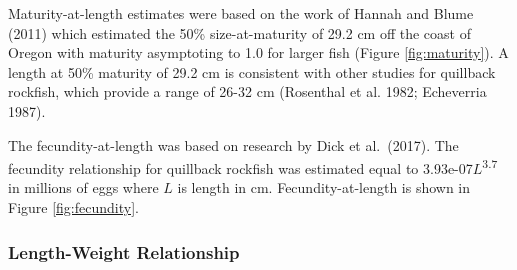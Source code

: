\documentclass[11pt,
  english,
  letterpaper,
]{article}
\begin{document}
\leavevmode\tagmcend\tagstructend


Maturity-at-length estimates were based on the work of Hannah and Blume {(2011)\leavevmode\tagmcend\tagstructend} which estimated the 50\% size-at-maturity of 29.2 cm off the coast of Oregon with maturity asymptoting to 1.0 for larger fish (Figure \ref{fig:maturity}). A length at 50\% maturity of 29.2 cm is consistent with other studies for quillback rockfish, which provide a range of 26-32 cm {(Rosenthal et al. 1982; Echeverria 1987)\leavevmode\tagmcend\tagstructend}.

\leavevmode\tagmcend\tagstructend\par


The fecundity-at-length was based on research by Dick et al.~{(2017)\leavevmode\tagmcend\tagstructend}. The fecundity relationship for quillback rockfish was estimated equal to 3.93e-07{\(L\)\leavevmode\tagmcend\tagstructend}\textsuperscript{3.7} in millions of eggs where {\(L\)\leavevmode\tagmcend\tagstructend} is length in cm. Fecundity-at-length is shown in Figure \ref{fig:fecundity}.

\leavevmode\tagmcend\tagstructend\par


\hypertarget{length-weight-relationship}{%
\subsubsection{Length-Weight Relationship}\label{length-weight-relationship}}

\leavevmode\tagmcend\tagstructend

\end{document}
